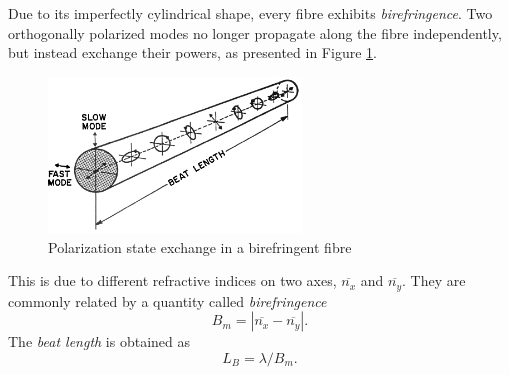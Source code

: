 \documentclass{standalone}
\begin{document}
Due to its imperfectly cylindrical shape, every fibre exhibits \textit{birefringence}. Two orthogonally polarized modes no longer propagate along the fibre independently, but instead exchange their powers, as presented in Figure \ref{fig:birefringence}.
\begin{figure}[h]
	\centering
	\includegraphics[width=0.6\textwidth]{birefringence.png}
	\caption{Polarization state exchange in a birefringent fibre \cite{agrawal}}
	\label{fig:birefringence}
\end{figure}
This is due to different refractive indices on two axes, $\overline{n_x}$ and $\overline{n_y}$. They are commonly related by a quantity called \textit{birefringence}
\begin{equation}
B_m = \left| \overline{n_x} - \overline{n_y} \right| \textrm{.}
\end{equation}
The \textit{beat length} is obtained as
\begin{equation}
L_B = \lambda / B_m \textrm{.}
\end{equation} \\
\end{document}
